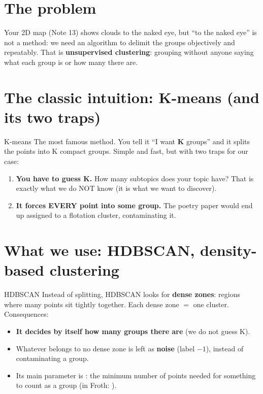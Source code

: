 \documentclass[11pt,a4paper]{article}
\begin{document}

\section{The problem}

Your 2D map (Note 13) shows clouds to the naked eye, but ``to the naked eye'' is not a method:
we need an algorithm to delimit the groups objectively and repeatably. That is
\textbf{unsupervised clustering}: grouping without anyone saying what each group is or how
many there are.

\section{The classic intuition: K-means (and its two traps)}

\begin{concepto}{K-means}
The most famous method. You tell it ``I want \textbf{K} groups'' and it splits the points into
K compact groups. Simple and fast, but with two traps for our case:
\begin{enumerate}
  \item \textbf{You have to guess K.} How many subtopics does your topic have? That is exactly
        what we do NOT know (it is what we want to discover).
  \item \textbf{It forces EVERY point into some group.} The poetry paper would end up assigned
        to a flotation cluster, contaminating it.
\end{enumerate}
\end{concepto}

\section{What we use: HDBSCAN, density-based clustering}

\begin{concepto}{HDBSCAN}
Instead of splitting, HDBSCAN looks for \textbf{dense zones}: regions where many points sit
tightly together. Each dense zone $=$ one cluster. Consequences:
\begin{itemize}
  \item \textbf{It decides by itself how many groups there are} (we do not guess K).
  \item Whatever belongs to no dense zone is left as \textbf{noise} (label $-1$), instead of
        contaminating a group.
  \item Its main parameter is : the minimum number of points needed
        for something to count as a group (in Froth: ).
\end{itemize}
\end{concepto}
\end{document}
